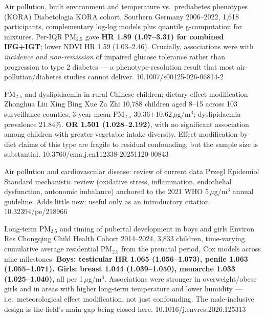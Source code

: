 \documentclass[10pt]{article}
\begin{document}
{Air pollution, built environment and temperature vs.\ prediabetes phenotypes (KORA)}
{Diabetologia}
{KORA cohort, Southern Germany 2006--2022, 1{,}618 participants, complementary log-log
models plus quantile g-computation for mixtures. Per-IQR PM$_{2.5}$ gave
\textbf{HR 1.89 (1.07--3.31) for combined IFG+IGT}; lower NDVI HR 1.59 (1.03--2.46).
Crucially, associations were with \emph{incidence and non-remission} of impaired glucose
tolerance rather than progression to type 2 diabetes --- a phenotype-resolution result
that most air-pollution/diabetes studies cannot deliver.}
{10.1007/s00125-026-06814-2}

{PM$_{2.5}$ and dyslipidaemia in rural Chinese children; dietary effect modification}
{Zhonghua Liu Xing Bing Xue Za Zhi}
{10{,}788 children aged 8--15 across 103 surveillance counties; 3-year mean PM$_{2.5}$
30.36$\pm$10.62\,$\mu$g/m$^3$; dyslipidaemia prevalence 21.84\%. \textbf{OR 1.501
(1.028--2.192)}, with no significant association among children with greater vegetable
intake diversity. Effect-modification-by-diet claims of this type are fragile to
residual confounding, but the sample size is substantial.}
{10.3760/cma.j.cn112338-20251120-00843}

{Air pollution and cardiovascular disease: review of current data}
{Przegl Epidemiol}
{Standard mechanistic review (oxidative stress, inflammation, endothelial dysfunction,
autonomic imbalance) anchored to the 2021 WHO 5\,$\mu$g/m$^3$ annual guideline. Adds
little new; useful only as an introductory citation.}
{10.32394/pe/218966}


{Long-term PM$_{2.5}$ and timing of pubertal development in boys and girls}
{Environ Res}
{Chongqing Child Health Cohort 2014--2024, 3{,}833 children, time-varying cumulative
average residential PM$_{2.5}$ from the prenatal period, Cox models across nine
milestones. \textbf{Boys: testicular HR 1.065 (1.056--1.073), penile 1.063
(1.055--1.071). Girls: breast 1.044 (1.039--1.050), menarche 1.033 (1.025--1.040),}
all per 1\,$\mu$g/m$^3$. Associations were stronger in overweight/obese girls and in
areas with higher long-term temperature and lower humidity --- i.e.\ meteorological
effect modification, not just confounding. The male-inclusive design is the field's
main gap being closed here.}
{10.1016/j.envres.2026.125313}
\end{document}
